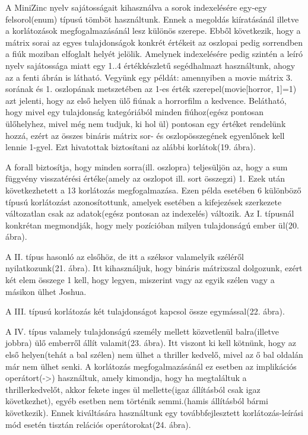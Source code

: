 \documentclass[12pt,a4paper,twoside, openright]{report}
\begin{document}
				
				A MiniZinc nyelv sajátosságait kihasználva a sorok indexelésére egy-egy felsorol(enum) típusú tömböt használtunk. Ennek a megoldás kiíratásánál illetve a korlátozások megfogalmazásánál lesz különös szerepe. Ebből következik, hogy a mátrix sorai az egyes tulajdonságok konkrét értékeit az oszlopai pedig sorrendben a fiúk moziban elfoglalt helyét jelölik. Amelynek indexelésére pedig szintén a leíró nyelv sajátossága miatt egy {1..4} értékkészletű segédhalmazt használtunk, ahogy az a fenti ábrán is látható. Vegyünk egy példát: amennyiben a movie mátrix 3. sorának és 1. oszlopának metszetében az 1-es érték szerepel(movie[horror, 1]=1) azt jelenti, hogy az első helyen ülő fiúnak a horrorfilm a kedvence.
				Belátható, hogy mivel egy tulajdonság kategóriából minden fiúhoz(egész pontosan ülőhelyhez, mivel még nem tudjuk, ki hol ül) pontosan egy értéket rendelünk hozzá, ezért az összes bináris mátrix sor- és oszlopösszegének egyenlőnek kell lennie 1-gyel. Ezt hivatottak biztosítani az alábbi korlátok(19. ábra).
				
				
				A forall biztosítja, hogy minden sorra(ill. oszlopra) teljesüljön az, hogy a sum függvény visszatérési értéke(amely az oszlopot ill. sort összegzi) 1.
				Ezek után következhetett a 13 korlátozás megfogalmazása. Ezen példa esetében 6 különböző típusú korlátozást azonosítottunk, amelyek esetében a kifejezések szerkezete változatlan csak az adatok(egész pontosan az indexelés) változik.
				Az I. típusnál konkrétan megmondják, hogy mely pozícióban milyen tulajdonságú ember ül(20. ábra).
				
				
				A II. típus hasonló az elsőhöz, de itt a széksor valamelyik széléről nyilatkozunk(21. ábra). Itt kihasználjuk, hogy bináris mátrixszal dolgozunk, ezért két elem összege 1 kell, hogy legyen, miszerint vagy az egyik szélen vagy a másikon ülhet Joshua.
				
				
				A III. típusú korlátozás két tulajdonságot kapcsol össze egymással(22. ábra).
				
				
				A IV. típus valamely tulajdonságú személy mellett közvetlenül balra(illetve jobbra) ülő emberről állít valamit(23. ábra). Itt viszont ki kell kötnünk, hogy az első helyen(tehát a bal szélen) nem ülhet a thriller kedvelő, mivel az ő bal oldalán már nem ülhet senki. A korlátozás megfogalmazásánál ez esetben az implikációs operátort(->) használtuk, amely kimondja, hogy ha megtaláltuk a thrillerkedvelőt, akkor fekete inges ül mellette(igaz állításból csak igaz következhet), egyéb esetben nem történik semmi.(hamis állításból bármi következik). Ennek kiváltására használtunk egy továbbfejlesztett korlátozás-leírási mód esetén tisztán relációs operátorokat(24. ábra).
				
\end{document}
